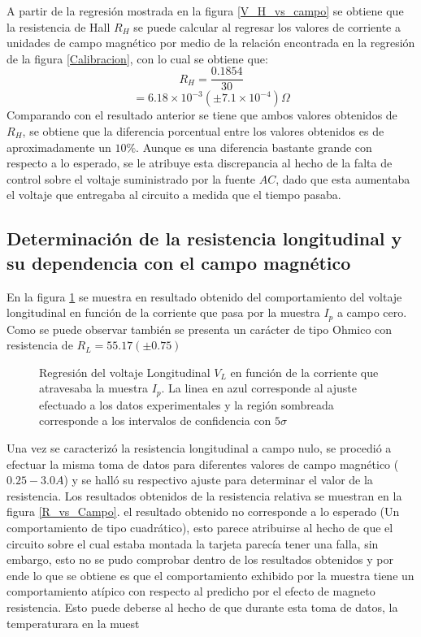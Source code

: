 \documentclass[%
 reprint,
 amsmath,amssymb,
 aps,
]{revtex4-1}
\begin{document}
A partir de la regresión mostrada en la figura \ref{V_H_vs_campo} se obtiene que la resistencia de Hall $R_H$ se puede calcular al regresar los valores de corriente a unidades de campo magnético por medio de la relación encontrada en la regresión de la figura \ref{Calibracion}, con lo cual se obtiene que:
\[R_H=\frac{0.1854}{30}\]
\[=6.18\times 10^{-3} (\pm 7.1\times 10^{-4})\Omega\]
Comparando con el resultado anterior se tiene que ambos valores obtenidos de $R_H$, se obtiene que la diferencia porcentual entre los valores obtenidos es de aproximadamente un $10\%$. Aunque es una diferencia bastante grande con respecto a lo esperado, se le atribuye esta discrepancia al hecho de la falta de control sobre el voltaje suministrado por la fuente $AC$, dado que esta aumentaba el voltaje que entregaba al circuito a medida que el tiempo pasaba. 
\subsection{Determinación de la resistencia longitudinal y su dependencia con el campo magnético}
En la figura \ref{V longitudinal vs ip} se muestra en resultado obtenido del comportamiento del voltaje longitudinal en función de la corriente que pasa por la muestra $I_p$ a campo cero. Como se puede observar también se presenta un carácter de tipo Ohmico con resistencia de $R_L = 55.17 (\pm 0.75)$
\begin{figure}[h!]
\caption{\label{V longitudinal vs ip}Regresión del voltaje Longitudinal $V_L$ en función de la corriente que atravesaba la muestra $I_p$.  La linea en azul corresponde al ajuste efectuado a los datos experimentales y la región sombreada corresponde a los intervalos de confidencia con $5\sigma$}
\end{figure}

Una vez se caracterizó la resistencia longitudinal a campo nulo, se procedió a efectuar la misma toma de datos para diferentes valores de campo magnético ($0.25 - 3.0 A$) y se halló su respectivo ajuste para determinar el valor de la resistencia. Los resultados obtenidos de la resistencia relativa se muestran en la figura \ref{R_vs_Campo}. el resultado obtenido no corresponde a lo esperado (Un comportamiento de tipo cuadrático), esto parece atribuirse al hecho de que el circuito sobre el cual estaba montada la tarjeta parecía tener una falla, sin embargo, esto no se pudo comprobar dentro de los resultados obtenidos y por ende lo que se obtiene es que el comportamiento exhibido por la muestra tiene un comportamiento atípico con respecto al predicho por el efecto de magneto resistencia. Esto puede deberse al hecho de que durante esta toma de datos, la temperaturara en la muest
\end{document}
